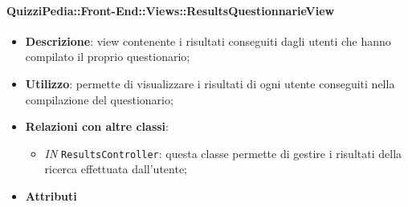 \paragraph{QuizziPedia::Front-End::Views::ResultsQuestionnarieView}
\begin{itemize}
	\item \textbf{Descrizione}: view contenente i risultati conseguiti dagli utenti che hanno compilato il proprio questionario;
	\item \textbf{Utilizzo}: permette di visualizzare i risultati di ogni utente conseguiti nella compilazione del questionario;
	\item \textbf{Relazioni con altre classi}:
	\begin{itemize}
		\item \textit{IN} \texttt{ResultsController}: questa classe permette di gestire i risultati della ricerca effettuata dall'utente;
	\end{itemize}
	\item \textbf{Attributi}
\end{itemize}